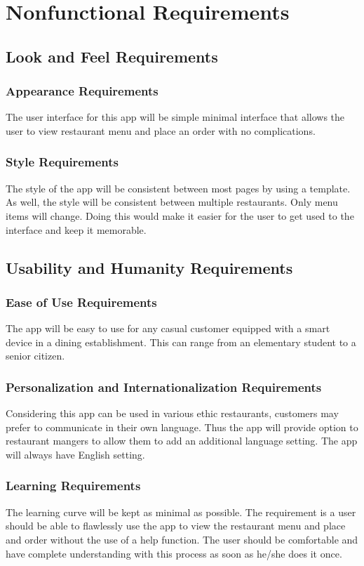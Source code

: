 \documentclass[12pt, titlepage]{article}
\begin{document}
\section{Nonfunctional Requirements}
\subsection{Look and Feel Requirements}
\subsubsection{Appearance Requirements}
The user interface for this app will be simple minimal interface that allows the user to view restaurant menu and place an order with no complications. 
\subsubsection{Style Requirements}
The style of the app will be consistent between most pages by using a template. As well, the style will be consistent between multiple restaurants. Only menu items will change. Doing this would make it easier for the user to get used to the interface and keep it memorable.
\subsection{Usability and Humanity Requirements}
\subsubsection{Ease of Use Requirements}
 The app will be easy to use for any casual customer equipped with a smart device in a dining establishment. This can range from an elementary student to a senior citizen.  
\subsubsection{Personalization and Internationalization Requirements}
Considering this app can be used in various ethic restaurants, customers may prefer to communicate in their own language. Thus the app will provide option to restaurant mangers to allow them to add an additional language setting. The app will always have English setting.
\subsubsection{Learning Requirements}
The learning curve will be kept as minimal as possible. The requirement is a user should be able to flawlessly use the app to view the restaurant menu and place and order without the use of a help function. The user should be comfortable and have complete understanding with this process as soon as he/she does it once.
\end{document}
